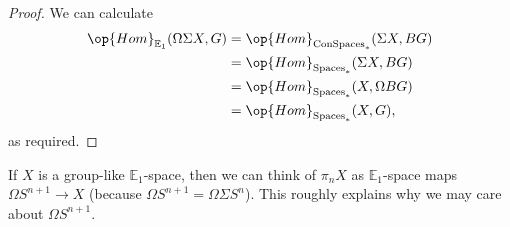 \documentclass[../notes.tex]{subfiles}
\begin{document}
\begin{proof}
	We can calculate
	\begin{align*}
		\op{Hom}_{\mathbb E_1}(\Omega\Sigma X,G) &= \op{Hom}_{\mathrm{ConSpaces}_*}(\Sigma X,BG) \\
		&= \op{Hom}_{\mathrm{Spaces}_*}(\Sigma X,BG) \\
		&= \op{Hom}_{\mathrm{Spaces}_*}(X,\Omega BG) \\
		&= \op{Hom}_{\mathrm{Spaces}_*}(X,G),
	\end{align*}
	as required.
\end{proof}
\begin{example}
	If $X$ is a group-like $\mathbb E_1$-space, then we can think of $\pi_nX$ as $\mathbb E_1$-space maps $\Omega S^{n+1}\to X$ (because $\Omega S^{n+1}=\Omega\Sigma S^n$). This roughly explains why we may care about $\Omega S^{n+1}$.
\end{example}
\end{document}
